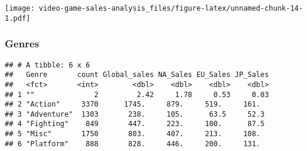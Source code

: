 \documentclass[]{article}
\newenvironment{Shaded}{\begin{snugshade}}{\end{snugshade}}
\newcommand{\DataTypeTok}[1]{\textcolor[rgb]{0.13,0.29,0.53}{#1}}
\newcommand{\DecValTok}[1]{\textcolor[rgb]{0.00,0.00,0.81}{#1}}
\newcommand{\KeywordTok}[1]{\textcolor[rgb]{0.13,0.29,0.53}{\textbf{#1}}}
\newcommand{\NormalTok}[1]{#1}
\newcommand{\OperatorTok}[1]{\textcolor[rgb]{0.81,0.36,0.00}{\textbf{#1}}}
\newcommand{\StringTok}[1]{\textcolor[rgb]{0.31,0.60,0.02}{#1}}
\begin{document}
\texttt{[image: video-game-sales-analysis\_files/figure-latex/unnamed-chunk-14-1.pdf]}

\hypertarget{genres}{%
\subsubsection{Genres}\label{genres}}

\begin{Shaded}
\end{Shaded}

\begin{verbatim}
## # A tibble: 6 x 6
##   Genre       count Global_sales NA_Sales EU_Sales JP_Sales
##   <fct>       <int>        <dbl>    <dbl>    <dbl>    <dbl>
## 1 ""              2         2.42     1.78     0.53     0.03
## 2 "Action"     3370      1745.     879.     519.     161.  
## 3 "Adventure"  1303       238.     105.      63.5     52.3 
## 4 "Fighting"    849       447.     223.     100.      87.5 
## 5 "Misc"       1750       803.     407.     213.     108.  
## 6 "Platform"    888       828.     446.     200.     131.
\end{verbatim}

\begin{Shaded}
\end{Shaded}
\end{document}
